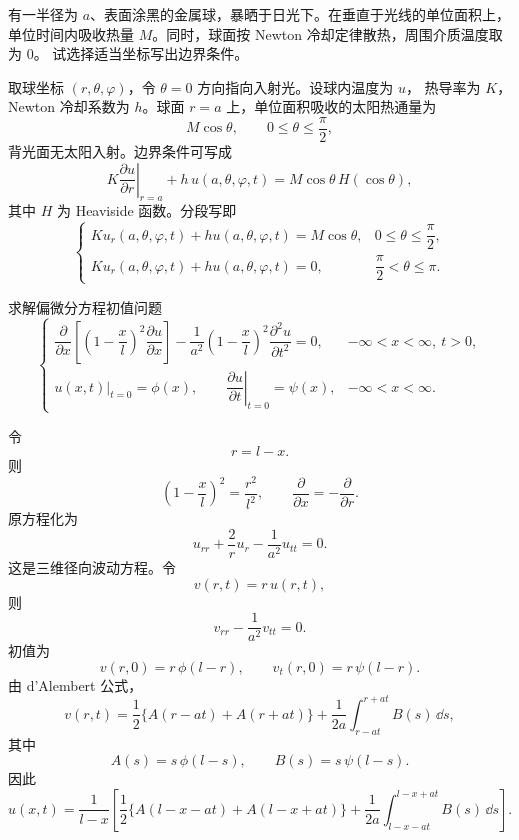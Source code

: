 \begin{question}
有一半径为 \(a\)、表面涂黑的金属球，暴晒于日光下。在垂直于光线的单位面积上，
单位时间内吸收热量 \(M\)。同时，球面按 Newton 冷却定律散热，周围介质温度取为 \(0\)。
试选择适当坐标写出边界条件。

\begin{solution}
取球坐标 \((r,\theta,\varphi)\)，令 \(\theta=0\) 方向指向入射光。设球内温度为 \(u\)，
热导率为 \(K\)，Newton 冷却系数为 \(h\)。球面 \(r=a\) 上，单位面积吸收的太阳热通量为
\[
M\cos\theta,\qquad 0\le\theta\le\frac{\pi}{2},
\]
背光面无太阳入射。边界条件可写成
\[
K\left.\frac{\partial u}{\partial r}\right|_{r=a}
+h\,u(a,\theta,\varphi,t)
=M\cos\theta\,H(\cos\theta),
\]
其中 \(H\) 为 Heaviside 函数。分段写即
\[
\begin{cases}
K u_r(a,\theta,\varphi,t)+h u(a,\theta,\varphi,t)=M\cos\theta,
&0\le\theta\le \dfrac{\pi}{2},\\
K u_r(a,\theta,\varphi,t)+h u(a,\theta,\varphi,t)=0,
&\dfrac{\pi}{2}<\theta\le \pi.
\end{cases}
\]
\end{solution}
\end{question}

\begin{question}
求解偏微分方程初值问题
\[
\begin{cases}
\dfrac{\partial}{\partial x}
\left[\left(1-\dfrac{x}{l}\right)^2\dfrac{\partial u}{\partial x}\right]
-\dfrac{1}{a^2}\left(1-\dfrac{x}{l}\right)^2
\dfrac{\partial^2u}{\partial t^2}=0,
&-\infty<x<\infty,\ t>0,\\
u(x,t)|_{t=0}=\phi(x),\qquad
\left.\dfrac{\partial u}{\partial t}\right|_{t=0}=\psi(x),
&-\infty<x<\infty.
\end{cases}
\]
\begin{solution}
令
\[
r=l-x.
\]
则
\[
\left(1-\frac{x}{l}\right)^2=\frac{r^2}{l^2},\qquad
\frac{\partial}{\partial x}=-\frac{\partial}{\partial r}.
\]
原方程化为
\[
u_{rr}+\frac{2}{r}u_r-\frac{1}{a^2}u_{tt}=0.
\]
这是三维径向波动方程。令
\[
v(r,t)=r\,u(r,t),
\]
则
\[
v_{rr}-\frac{1}{a^2}v_{tt}=0.
\]
初值为
\[
v(r,0)=r\,\phi(l-r),\qquad
v_t(r,0)=r\,\psi(l-r).
\]
由 d'Alembert 公式，
\[
v(r,t)=\frac12\{A(r-at)+A(r+at)\}
+\frac{1}{2a}\int_{r-at}^{r+at}B(s)\,\dd{s},
\]
其中
\[
A(s)=s\,\phi(l-s),\qquad B(s)=s\,\psi(l-s).
\]
因此
\[
u(x,t)=\frac{1}{l-x}
\left[
\frac12\{A(l-x-at)+A(l-x+at)\}
+\frac{1}{2a}\int_{l-x-at}^{l-x+at}B(s)\,\dd{s}
\right].
\]
\end{solution}
\end{question}


